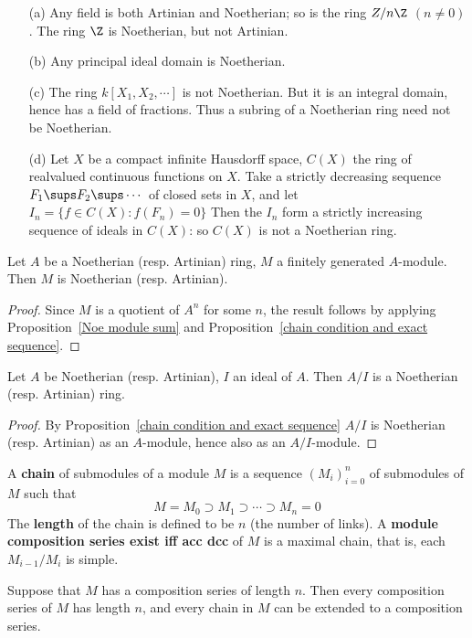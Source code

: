 \begin{example}
\mbox{}
\begin{itemize}
\item[(a)] Any field is both Artinian and Noetherian; so is the ring $Z/n\Z$ $(n\neq 0)$. The ring $\Z$ is Noetherian, but not Artinian.
\item[(b)] Any principal ideal domain is Noetherian.
\item[(c)] The ring $k[X_1,X_2,\cdots]$ is not Noetherian. But it is an integral domain, hence has a field of fractions. Thus a subring of a Noetherian
ring need not be Noetherian.
\item[(d)] Let $X$ be a compact infinite Hausdorff space, $C(X)$ the ring of realvalued continuous functions on $X$. Take a strictly decreasing sequence $F_1\sups F_2\sups\cdots$ of closed sets in $X$, and let $I_n=\{f\in C(X):f(F_n)=0\}$ Then the $I_n$ form a strictly increasing sequence of ideals in $C(X)$: so $C(X)$ is not a Noetherian ring.
\end{itemize}
\end{example}
\begin{proposition}\label{Noe finite module is Noe}
Let $A$ be a Noetherian (resp. Artinian) ring, $M$ a finitely generated $A$-module. Then $M$ is Noetherian (resp. Artinian).
\end{proposition}
\begin{proof}
Since $M$ is a quotient of $A^n$ for some $n$, the result follows by applying Proposition~\ref{Noe module sum} and Proposition~\ref{chain condition and exact sequence}.
\end{proof}
\begin{proposition}\label{Noe quotient ring}
Let $A$ be Noetherian (resp. Artinian), $I$ an ideal of $A$. Then $A/I$ is a Noetherian (resp. Artinian) ring.
\end{proposition}
\begin{proof}
By Proposition~\ref{chain condition and exact sequence} $A/I$ is Noetherian (resp. Artinian) as an $A$-module, hence also as an $A/I$-module.
\end{proof}
A \textbf{chain} of submodules of a module $M$ is a sequence $(M_i)_{i=0}^{n}$ of submodules of $M$ such that
\[M=M_0\supset M_1\supset\cdots\supset M_n=0\]
The \textbf{length} of the chain is defined to be $n$ (the number of links). A \textbf{module composition series exist iff acc dcc} of $M$ is a maximal chain, that is, each $M_{i-1}/M_{i}$ is simple.
\begin{proposition}\label{module composition series length unique}
Suppose that $M$ has a composition series of length $n$. Then every composition series of $M$ has length $n$, and every chain in $M$ can be extended to a composition series.
\end{proposition}
